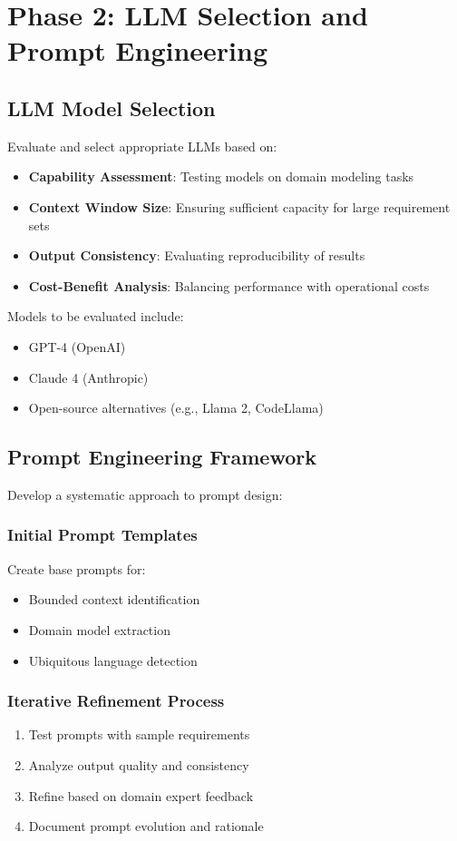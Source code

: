 \section{Phase 2: LLM Selection and Prompt Engineering}

\subsection{LLM Model Selection}
Evaluate and select appropriate LLMs based on:
\begin{itemize}
    \item \textbf{Capability Assessment}: Testing models on domain modeling tasks
    \item \textbf{Context Window Size}: Ensuring sufficient capacity for large requirement sets
    \item \textbf{Output Consistency}: Evaluating reproducibility of results
    \item \textbf{Cost-Benefit Analysis}: Balancing performance with operational costs
\end{itemize}

Models to be evaluated include:
\begin{itemize}
    \item GPT-4 (OpenAI)
    \item Claude 4 (Anthropic)
    \item Open-source alternatives (e.g., Llama 2, CodeLlama)
\end{itemize}

\subsection{Prompt Engineering Framework}

Develop a systematic approach to prompt design:

\subsubsection{Initial Prompt Templates}
Create base prompts for:
\begin{itemize}
    \item Bounded context identification
    \item Domain model extraction
    \item Ubiquitous language detection
\end{itemize}

\subsubsection{Iterative Refinement Process}
\begin{enumerate}
    \item Test prompts with sample requirements
    \item Analyze output quality and consistency
    \item Refine based on domain expert feedback
    \item Document prompt evolution and rationale
\end{enumerate}

